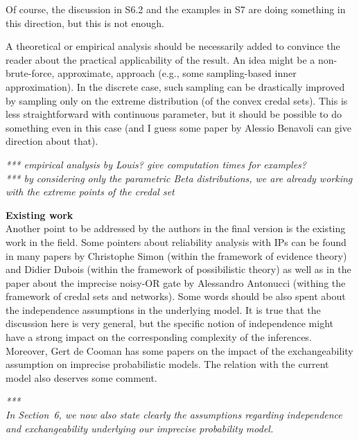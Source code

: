 \documentclass[12pt, a4paper]{elsarticle}
\begin{document}
Of course, the discussion in S6.2 and the examples in S7 are doing something in this direction, but this is not enough.

A theoretical or empirical analysis should be necessarily added to convince the reader about the practical applicability of the result.
An idea might be a non-brute-force, approximate, approach (e.g., some sampling-based inner approximation). In the discrete case, such sampling can be drastically improved by sampling only on the extreme distribution (of the convex credal sets). This is less straightforward with continuous parameter, but it should be possible to do something even in this case (and I guess some paper by Alessio Benavoli can give direction about that).

\medskip
\emph{*** empirical analysis by Louis? give computation times for examples?\\
*** by considering only the parametric Beta distributions, we are already working with the extreme points of the credal set}
%
\medskip

\textbf{Existing work}\\
Another point to be addressed by the authors in the final version is the existing work in the field. Some pointers about reliability analysis with IPs can be found in many papers by Christophe Simon (within the framework of evidence theory) and Didier Dubois (within the framework of possibilistic theory) as well as in the paper about the imprecise noisy-OR gate by Alessandro Antonucci (withing the framework of credal sets and networks). Some words should be also spent about the independence assumptions in the underlying model. It is true that the discussion here is very general, but the specific notion of independence might have a strong impact on the corresponding complexity of the inferences. Moreover, Gert de Cooman has some papers on the impact of the exchangeability assumption on imprecise probabilistic models. The relation with the current model also deserves some comment.

\medskip
\emph{***\\
In Section~6, we now also state clearly the assumptions regarding independence and exchangeability
underlying our imprecise probability model.}
\medskip
\end{document}
